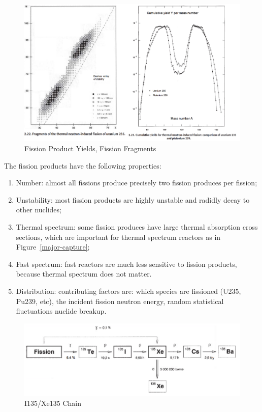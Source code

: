 \documentclass{school-22.211-notes}
\date{April  9, 2012}
\begin{document}
\maketitle

 \label{fission-product-poisoning}
\begin{figure}[ht]
  \centering
  \includegraphics[width=5in]{images/dfs/fission-product-yield.png}
  \caption{Fission Product Yields, Fission Fragments}
\end{figure}

The fission products have the following properties: 
\begin{enumerate}
\item Number: almost all fissions produce precisely two fission produces per fission;
\item Unstability: most fission products are highly unstable and radidly decay to other nuclides;
\item Thermal spectrum: some fission produces have large thermal absorption cross sections, which are important for thermal spectrum reactors as in Figure~\ref{major-capture};
\item Fast spectrum: fast reactors are much less sensitive to fission products, because thermal spectrum does not matter. 
\item Distribution: contributing factors are: which species are fissioned (U235, Pu239, etc), the incident fission neutron energy, random statistical fluctuations nuclide breakup.
\end{enumerate}
\begin{figure}
  \centering
  \includegraphics[width=5in]{images/dfs/Xe135.png}
  \caption{I135/Xe135 Chain} \label{Xe135} 
\end{figure}
\end{document}
